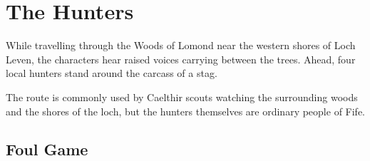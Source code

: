 \section*{The Hunters}
{\entryfont While travelling through the Woods of Lomond near the western shores of Loch Leven, the characters hear raised voices carrying between the trees. Ahead, four local hunters stand around the carcass of a stag.

The route is commonly used by Caelthir scouts watching the surrounding woods and the shores of the loch, but the hunters themselves are ordinary people of Fife.}
\subsection*{Foul Game}
